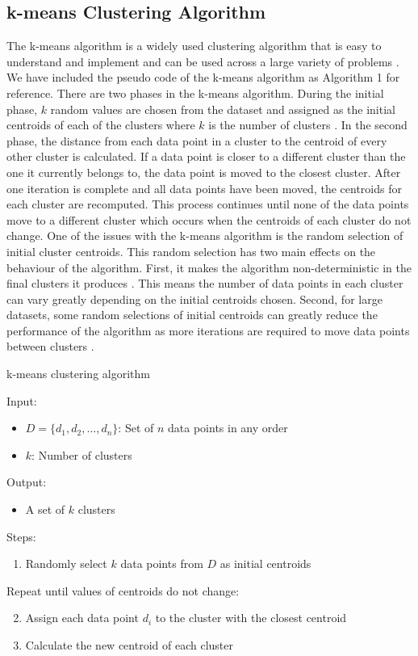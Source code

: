 \documentclass[conference,compsoc]{IEEEtran}
\begin{document}
\subsection{k-means Clustering Algorithm}

The k-means algorithm is a widely used clustering algorithm that is easy to understand and implement and can be used across a large variety of problems \cite{b1, b2, b3, b4, b5}. We have included the pseudo code of the k-means algorithm as Algorithm 1 for reference. There are two phases in the k-means algorithm. During the initial phase, $k$ random values are chosen from the dataset and assigned as the initial centroids of each of the clusters where $k$ is the number of clusters \cite{b1}. In the second phase, the distance from each data point in a cluster to the centroid of every other cluster is calculated. If a data point is closer to a different cluster than the one it currently belongs to, the data point is moved to the closest cluster. After one iteration is complete and all data points have been moved, the centroids for each cluster are recomputed. This process continues until none of the data points move to a different cluster which occurs when the centroids of each cluster do not change. One of the issues with the k-means algorithm is the random selection of initial cluster centroids. This random selection has two main effects on the behaviour of the algorithm. First, it makes the algorithm non-deterministic in the final clusters it produces \cite{b1}. This means the number of data points in each cluster can vary greatly depending on the initial centroids chosen. Second, for large datasets, some random selections of initial centroids can greatly reduce the performance of the algorithm as more iterations are required to move data points between clusters \cite{b1, b2}.

\begin{algorithm}\label{alg-1}
    \caption{k-means clustering algorithm}
    Input:
        \begin{itemize}
            \item $D = \{d_1, d_2, \dots, d_n\}$: Set of $n$ data points in any order
            \item $k$: Number of clusters
        \end{itemize}
    Output:
        \begin{itemize}
            \item A set of $k$ clusters
        \end{itemize}
    Steps:
        \begin{enumerate}
            \item Randomly select $k$ data points from $D$ as initial centroids
        \end{enumerate}
        Repeat until values of centroids do not change:
        \begin{enumerate}
        \setcounter{enumi}{1}
            \item Assign each data point $d_i$ to the cluster with the closest centroid
            \item Calculate the new centroid of each cluster
        \end{enumerate}
\end{algorithm}
\end{document}
